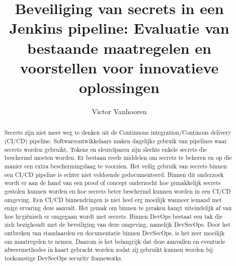 \documentclass{hogent-article}
\title{Beveiliging van secrets in een Jenkins pipeline: Evaluatie van bestaande maatregelen en voorstellen voor innovatieve oplossingen 
}
\author{Victor Vanhooren}
\begin{document}
\begin{abstract}
  Secrets zijn niet meer weg te denken uit de Continuous integration/Continous delivery (CI/CD) pipeline. Softwareontwikkelaars maken dagelijks gebruik van pipelines waar secrets worden gebruikt. Tokens en sleutelparen zijn slechts enkele secrets die beschermd moeten worden. Er bestaan reeds middelen om secrets te beheren en op die manier een extra beschermingslaag te voorzien. Het veilig gebruik van secrets binnen een CI/CD pipeline is echter niet voldoende gedocumenteerd. Binnen dit onderzoek wordt er aan de hand van een proof of concept onderzocht hoe gemakkelijk secrets gestolen kunnen worden en hoe secrets beter beschermd kunnen worden in een CI/CD omgeving. Een CI/CD binnendringen is niet heel erg moeilijk wanneer iemand met enige ervaring deze aanvalt. Het gemak om binnen te geraken hangt uiteindelijk af van hoe hygiënisch er omgegaan wordt met secrets. Binnen DevOps bestaat een tak die zich bezighoudt met de beveiliging van deze omgeving, namelijk DevSecOps. Door het ontbreken van standaarden en documentatie binnen DevSecOps, is het zeer moeilijk om maatregelen te nemen. Daarom is het belangrijk dat deze aanvallen en eventuele afweermethodes in kaart gebracht worden zodat zij gebruikt kunnen worden bij toekomstige DevSecOps security frameworks. 
\end{abstract}

\tableofcontents



\printbibliography[heading=bibintoc]
\end{document}
